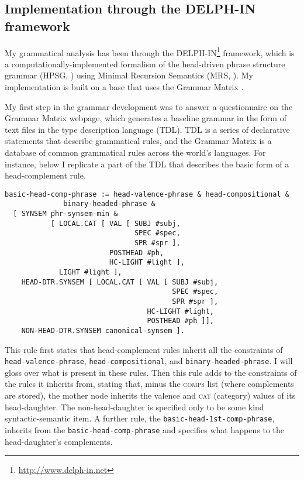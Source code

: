 \subsection{Implementation through the DELPH-IN framework} \label{sec:method:delphin}

My grammatical analysis has been through the DELPH-IN\footnote{\url{http://www.delph-in.net}} framework, which is a computationally-implemented formalism of the head-driven phrase structure grammar (HPSG, \citealt{pollardsag1994}) using Minimal Recursion Semantics (MRS, \citealt{copestake2005}). My implementation is built on a base that uses the Grammar Matrix \citep{bender2002, benderetal2010}.

My first step in the grammar development was to answer a questionnaire on the Grammar Matrix webpage, which generates a baseline grammar in the form of text files in the type description language (TDL). TDL is a series of declarative statements that describe grammatical rules, and the Grammar Matrix is a database of common grammatical rules across the world's languages. For instance, below I replicate a part of the TDL that describes the basic form of a head-complement rule.

\begin{verbatim}
basic-head-comp-phrase := head-valence-phrase & head-compositional &
              binary-headed-phrase &
  [ SYNSEM phr-synsem-min &
           [ LOCAL.CAT [ VAL [ SUBJ #subj,
                               SPEC #spec,
                               SPR #spr ],
                         POSTHEAD #ph,
                         HC-LIGHT #light ],
             LIGHT #light ],
    HEAD-DTR.SYNSEM [ LOCAL.CAT [ VAL [ SUBJ #subj,
                                        SPEC #spec,
                                        SPR #spr ],
                                  HC-LIGHT #light,
                                  POSTHEAD #ph ]],
    NON-HEAD-DTR.SYNSEM canonical-synsem ].
\end{verbatim}

\noindent This rule first states that head-complement rules inherit all the constraints of \texttt{head-valence-phrase}, \texttt{head-compositional}, and \texttt{binary-headed-phrase}. I will gloss over what is present in these rules. Then this rule adds to the constraints of the rules it inherits from, stating that, minus the \textsc{comps} list (where complements are stored), the mother node inherits the valence and \textsc{cat} (category) values of its head-daughter. The non-head-daughter is specified only to be some kind syntactic-semantic item. A further rule, the \texttt{basic-head-1st-comp-phrase}, inherits from the \texttt{basic-head-comp-phrase} and specifies what happens to the head-daughter's complements.

